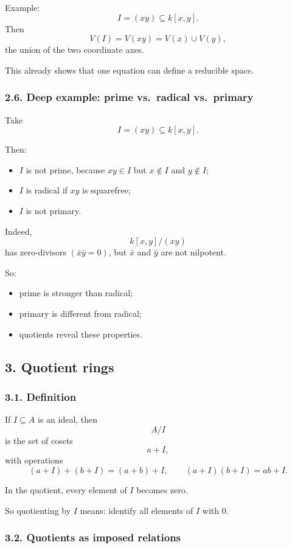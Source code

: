 \documentclass[12pt,a4paper]{article}
\theoremstyle{plain}
\theoremstyle{definition}      %
\begin{document}
	Example:
	\[
	I=(xy)\subseteq k[x,y].
	\]
	Then
	\[
	V(I)=V(xy)=V(x)\cup V(y),
	\]
	the union of the two coordinate axes.
	
	This already shows that one equation can define a reducible space.
	
	\subsubsection*{2.6. Deep example: prime vs.\ radical vs.\ primary}
	
	Take
	\[
	I=(xy)\subseteq k[x,y].
	\]
	
	Then:
	\begin{itemize}
		\item \(I\) is not prime, because \(xy\in I\) but \(x\notin I\) and \(y\notin I\);
		\item \(I\) is radical if \(xy\) is squarefree;
		\item \(I\) is not primary.
	\end{itemize}
	
	Indeed,
	\[
	k[x,y]/(xy)
	\]
	has zero-divisors \((\bar x\bar y=0)\), but \(\bar x\) and \(\bar y\) are not nilpotent.
	
	So:
	\begin{itemize}
		\item prime is stronger than radical;
		\item primary is different from radical;
		\item quotients reveal these properties.
	\end{itemize}
	
	\subsection*{3. Quotient rings}
	
	\subsubsection*{3.1. Definition}
	
	If \(I\subseteq A\) is an ideal, then
	\[
	A/I
	\]
	is the set of cosets
	\[
	a+I,
	\]
	with operations
	\[
	(a+I)+(b+I)=(a+b)+I,\qquad (a+I)(b+I)=ab+I.
	\]
	
	In the quotient, every element of \(I\) becomes zero.
	
	So quotienting by \(I\) means: identify all elements of \(I\) with \(0\).
	
	\subsubsection*{3.2. Quotients as imposed relations}
	
\end{document}
